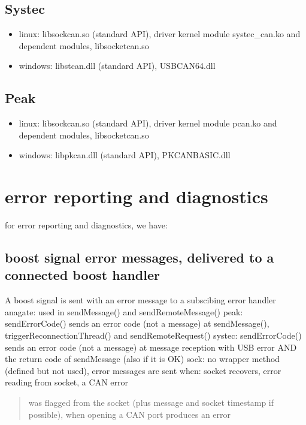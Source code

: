 \documentclass[a4paper,10pt,english]{sphinxmanual}
\begin{document}
\section{Systec}
\label{\detokenize{running:systec}}\begin{itemize}
\item {} 
\sphinxAtStartPar
linux: libsockcan.so (standard API), driver kernel module systec\_can.ko and dependent modules, libsocketcan.so

\item {} 
\sphinxAtStartPar
windows: libstcan.dll (standard API), USBCAN64.dll

\end{itemize}


\section{Peak}
\label{\detokenize{running:peak}}\begin{itemize}
\item {} 
\sphinxAtStartPar
linux: libsockcan.so (standard API), driver kernel module pcan.ko and dependent modules, libsocketcan.so

\item {} 
\sphinxAtStartPar
windows: libpkcan.dll (standard API), PKCANBASIC.dll

\end{itemize}


\chapter{error reporting and diagnostics}
\label{\detokenize{errors:error-reporting-and-diagnostics}}\label{\detokenize{errors::doc}}
\sphinxAtStartPar
for error reporting and diagnostics, we have:


\section{boost signal error messages, delivered to a connected boost handler}
\label{\detokenize{errors:boost-signal-error-messages-delivered-to-a-connected-boost-handler}}
\sphinxAtStartPar
A boost signal is sent with an error message to a subscibing error handler
\sphinxhyphen{} anagate: used in sendMessage() and sendRemoteMessage()
\sphinxhyphen{} peak: sendErrorCode() sends an error code (not a message) at sendMessage(), triggerReconnectionThread() and sendRemoteRequest()
\sphinxhyphen{} systec: sendErrorCode() sends an error code (not a message) at message reception with USB error AND the return code of sendMessage (also if it is OK)
\sphinxhyphen{} sock: no wrapper method (defined but not used), error messages are sent when: socket recovers, error reading from socket, a CAN error
\begin{quote}

\sphinxAtStartPar
was flagged from the socket (plus message and socket timestamp if possible), when opening a CAN port produces an error
\end{quote}
\end{document}
